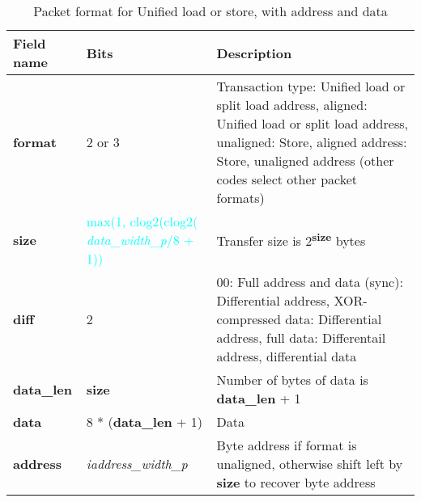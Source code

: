\begin{table}[htp]
  \centering
  \caption{Packet format for Unified load or store, with address and data}
  \label{tab:te_datadx0y0}
  \begin{tabulary}{\textwidth}{|l|p{38mm}|p{92mm}|}
    \hline
    {\bf Field name} & {\bf Bits} & {\bf Description} \\
    \hline
    \textbf{format} & 	2 or 3	& Transaction type: Unified load or split load address, aligned: Unified load or split load address, unaligned: Store, aligned address: Store, unaligned address\newline	
		(other codes select other packet formats)\\
    \hline
    \textbf{size} & \textcolor{cyan}{max(1, clog2(clog2( \textit{data\_width\_p}/8 + 1))} & Transfer size is 2\textsuperscript{\textbf{size}} bytes \\
    \hline
    \textbf{diff} & 2 & 00: Full address and data (sync): Differential address, XOR-compressed data: Differential address, full data: Differentail address, differential data\\
    \hline
    \textbf{data\_len}	& \textbf{size} & Number of bytes of data is \textbf{data\_len} + 1	\\
    \hline
    \textbf{data} & 8 * (\textbf{data\_len} + 1) & 
                Data\\
    \hline
    \textbf{address} &  \textit{iaddress\_width\_p} & Byte address if format is unaligned, otherwise shift left by \textbf{size} to recover byte address \\
    \hline
  \end{tabulary}
\end{table}



